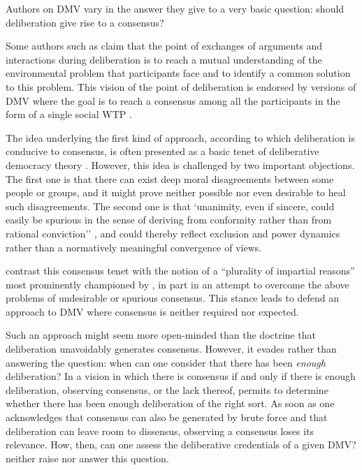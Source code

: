 \documentclass[version=3.21, pagesize, twoside=off, bibliography=totoc, DIV=calc, fontsize=12pt, a4paper, french, english]{scrartcl}
\begin{document}
Authors on DMV vary in the answer they give to a very basic question: should deliberation give rise to a consensus?

Some authors such as \citet{vatn_institutional_2009} claim that the point of exchanges of arguments and interactions during deliberation is to reach a mutual understanding of the environmental problem that participants face and to identify a common solution to this problem. 
This vision of the point of deliberation is endorsed by versions of DMV where the goal is to reach a consensus among all the participants in the form of a single social WTP \citep{orchard-webb_deliberative_2016}.


The idea underlying the first kind of approach, according to which deliberation is conducive to consensus, is often presented as a basic tenet of deliberative democracy theory \citep{wilson_discourse-based_2002}. 
However, this idea is challenged by two important objections.
The first one is that there can exist deep moral disagreements \citep{dryzek_deliberative_2013} between some people or groups, and it might prove neither possible nor even desirable to heal such disagreements.
The second one is that `unanimity, even if sincere, could easily be spurious in the sense of deriving from conformity rather than from rational conviction'' \citep{elster_sour_1983}, and could thereby reflect exclusion and power dynamics \citep{volker_exploring_2016,vargas_background_2016,vargas_problem_2017} rather than a normatively meaningful convergence of views.

\citeauthor{bartkowski_beyond_2018} contrast this consensus tenet with the notion of a ``plurality of impartial reasons'' most prominently championed by \citet{sen_idea_2009}, in part in an attempt to overcome the above problems of undesirable or spurious consensus.
This stance leads \citeauthor{bartkowski_beyond_2018} to defend an approach to DMV where consensus is neither required nor expected. 

Such an approach might seem more open-minded than the doctrine that deliberation unavoidably generates consensus. However, it evades rather than answering the question: when can one consider that there has been \emph{enough} deliberation? 
In a vision in which there is consensus if and only if there is enough deliberation, observing consensus, or the lack thereof, permits to determine whether there has been enough deliberation of the right sort. 
As soon as one acknowledges that consensus can also be generated by brute force and that deliberation can leave room to dissensus, observing a consensus loses its relevance. 
How, then, can one assess the deliberative credentials of a given DMV? 
\citeauthor{bartkowski_beyond_2018} neither raise nor answer this question.
\end{document}
